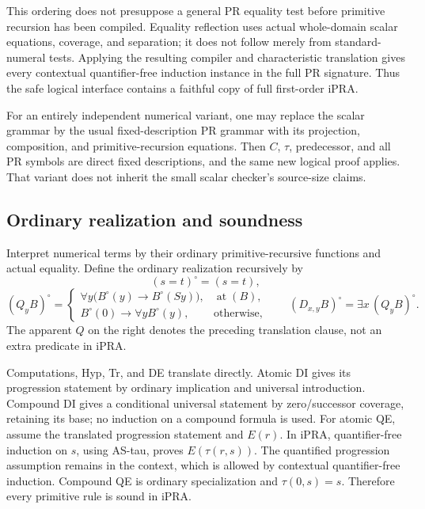 This ordering does not presuppose a general PR equality test before
primitive recursion has been compiled. Equality reflection uses actual
whole-domain scalar equations, coverage, and separation; it does not
follow merely from standard-numeral tests. Applying the resulting
compiler and characteristic translation gives every contextual
quantifier-free induction instance in the full PR signature. Thus the
safe logical interface contains a faithful copy of full first-order
iPRA.

For an entirely independent numerical variant, one may replace the
scalar grammar by the usual fixed-description PR grammar with its
projection, composition, and primitive-recursion equations. Then $C$,
$\tau$, predecessor, and all PR symbols are direct fixed descriptions,
and the same new logical proof applies. That variant does not inherit
the small scalar checker's source-size claims.

\subsection{Ordinary realization and soundness}

Interpret numerical terms by their ordinary primitive-recursive
functions and actual equality. Define the ordinary realization
recursively by
\[
 (s=t)^\circ=(s=t),
\]
\[
 (Q_yB)^\circ=
 \begin{cases}
  \forall y\bigl(B^\circ(y)\to B^\circ(Sy)\bigr),
       &\operatorname{at}(B),\\
  B^\circ(0)\to\forall y B^\circ(y),&\text{otherwise},
 \end{cases}
 \qquad
 (D_{x,y}B)^\circ=\exists x\,(Q_yB)^\circ.
 \tag{AS-realization}
\]
The apparent $Q$ on the right denotes the preceding translation
clause, not an extra predicate in iPRA.

Computations, Hyp, Tr, and DE translate directly. Atomic DI gives its
progression statement by ordinary implication and universal introduction.
Compound DI gives a conditional universal statement by zero/successor
coverage, retaining its base; no induction on a compound formula is
used. For atomic QE, assume the translated progression statement and
$E(r)$. In iPRA, quantifier-free induction on $s$, using AS-tau, proves
$E(\tau(r,s))$. The quantified progression assumption remains in the
context, which is allowed by contextual quantifier-free induction.
Compound QE is ordinary specialization and $\tau(0,s)=s$.
Therefore every primitive rule is sound in iPRA.


